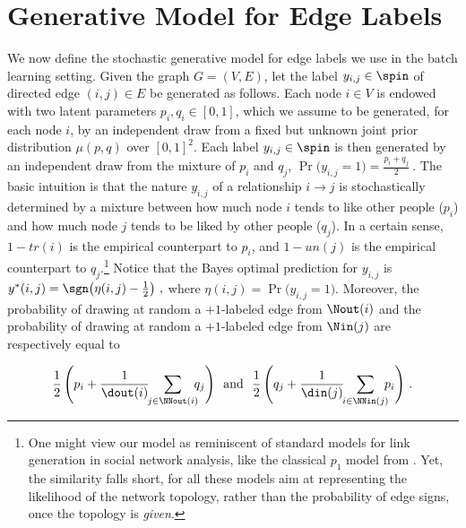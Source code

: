 
\section{Generative Model for Edge Labels}\label{s:gen}
We now define the stochastic generative model for edge labels we use in the batch learning setting. Given the graph $G = (V,E)$, let the label $y_{i,j} \in \spin$ of directed edge $(i,j) \in E$ be generated as follows. Each node $i \in V$ is endowed with two latent parameters $p_i, q_i \in [0,1]$, which we assume to be generated, for each node $i$, by an independent draw from a fixed but unknown joint prior distribution $\mu(p,q)$ over $[0,1]^2$. Each label $y_{i,j} \in \spin$ is then generated by an independent draw from the mixture of $p_i$ and $q_j$,
$
	\Pr\big( y_{i,j} = 1 \big) = \tfrac{p_i + q_j}{2}~.
$
The basic intuition is that the nature $y_{i,j}$ of a relationship $i\rightarrow j$ is stochastically determined by a mixture between how much node $i$ tends to like other people ($p_i$) and how much node $j$ tends to be liked by other people ($q_j$). In a certain sense, $1-tr(i)$ is the empirical counterpart to $p_i$, and $1-un(j)$ is the empirical counterpart to $q_j$.\footnote
{
One might view our model as reminiscent of standard models for link generation in social network analysis, like the classical $p_1$ model from \cite{hl81}. Yet, the similarity falls short, for all these models aim at representing the likelihood of the network topology, rather than the probability of edge signs, once the topology is {\em given}.
} 
Notice that the Bayes optimal prediction for $y_{i,j}$ is
$
	y^*(i,j) = \sgn\big(\eta(i,j) - \tfrac{1}{2}\big)~,
$
where $\eta(i,j) = \Pr\big( y_{i,j} = 1 \big)$. Moreover, the probability of drawing at random a $+1$-labeled edge from $\Nout(i)$ and the probability of drawing at random a $+1$-labeled edge from $\Nin(j)$ are respectively equal to
%

\begin{small}
\begin{equation}\label{e:pout}
\frac{1}{2}\,\Biggl(p_i + \frac{1}{\dout(i)}\!\!\sum_{j\in \NNout(i)} \!\!\! q_j \Biggl) \,\,\,\,\text{and}\,\,\,\,
%
\frac{1}{2}\,\Biggl(q_j + \frac{1}{\din(j)}\!\!\sum_{i\in \NNin(j)} \!\!\! p_i \Biggl)~.
\end{equation}
\end{small}
%
